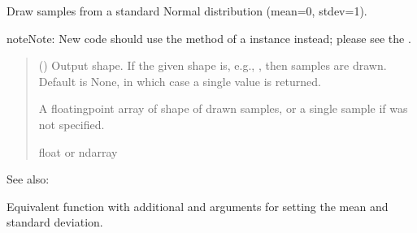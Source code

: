 \documentclass[letterpaper,10pt,english]{sphinxmanual}
\begin{document}

\begin{fulllineitems}
\label{\detokenize{metilda.controllers:metilda.controllers.pitch_art_wizard.standard_normal}}
\pysigstartsignatures
{}
\pysigstopsignatures
\sphinxAtStartPar
Draw samples from a standard Normal distribution (mean=0, stdev=1).

\begin{sphinxadmonition}{note}{Note:}
\sphinxAtStartPar
New code should use the
method of a  instance instead;
please see the .
\end{sphinxadmonition}
\begin{quote}\begin{description}
\sphinxAtStartPar
{} (\sphinxstyleliteralemphasis{\sphinxupquote{, }}) \textendash{} Output shape.  If the given shape is, e.g., , then
 samples are drawn.  Default is None, in which case a
single value is returned.

\sphinxAtStartPar
{} \textendash{} A floating\sphinxhyphen{}point array of shape  of drawn samples, or a
single sample if  was not specified.

\sphinxAtStartPar
float or ndarray

\end{description}\end{quote}


\begin{sphinxseealso}{See also:}
\begin{description}
\sphinxAtStartPar
Equivalent function with additional  and  arguments for setting the mean and standard deviation.


\end{description}
\end{sphinxseealso}
\end{fulllineitems}
\end{document}
